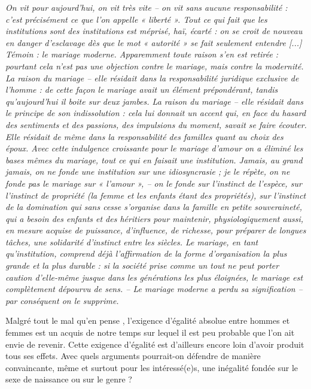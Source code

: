 \begin{displayquote}
%
\emph{On vit pour aujourd'hui, on vit très vite -- on vit sans aucune responsabilité : c'est précisément ce que l'on appelle « liberté ». Tout ce qui fait que les institutions sont des institutions est méprisé, haï, écarté : on se croit de nouveau en danger d'esclavage dès que le mot « autorité » se fait seulement entendre \emph{[...]} Témoin : \emph{le mariage moderne}. Apparemment toute raison s'en est retirée : pourtant cela n'est pas une objection contre le mariage, mais contre la modernité. La raison du mariage -- elle résidait dans la responsabilité juridique exclusive de l'homme : de cette façon le mariage avait un élément prépondérant, tandis qu'aujourd'hui il boite sur deux jambes. La raison du mariage -- elle résidait dans le principe de son indissolution : cela lui donnait un accent qui, en face du hasard des sentiments et des passions, des impulsions du moment, \emph{savait se faire écouter}. Elle résidait de même dans la responsabilité des familles quant au choix des époux. Avec cette indulgence croissante pour le mariage \emph{d'amour} on a éliminé les bases mêmes du mariage, tout ce qui en faisait une institution. Jamais, au grand jamais, on ne fonde une institution sur une idiosyncrasie ; je le répète, on ne fonde pas le mariage sur « l'amour », -- on le fonde sur l'instinct de l'espèce, sur l'instinct de propriété (la femme et les enfants étant des propriétés), sur \emph{l'instinct de la domination} qui sans cesse s'organise dans la famille en petite souveraineté, qui a \emph{besoin} des enfants et des héritiers pour maintenir, physiologiquement aussi, en mesure acquise de puissance, d'influence, de richesse, pour préparer de longues tâches, une solidarité d'instinct entre les siècles. Le mariage, en tant qu'institution, comprend déjà l'affirmation de la forme d'organisation la plus grande et la plus durable : si la société prise comme un tout ne peut \emph{porter caution} d'elle-même jusque dans les générations les plus éloignées, le mariage est complètement dépourvu de sens. -- Le mariage moderne a perdu sa signification -- par conséquent on le supprime.}  
%
\end{displayquote}


 Malgré tout le mal qu'en pense , l'exigence d'égalité absolue entre hommes et femmes est un acquis de notre temps sur lequel il est peu probable que l'on ait envie de revenir. Cette exigence d'égalité est d'ailleurs encore loin d'avoir produit tous ses effets. Avec quels arguments pourrait-on défendre de manière convaincante, même et surtout pour les intéressé(e)s, une inégalité fondée sur le sexe de naissance ou sur le genre ?
 
